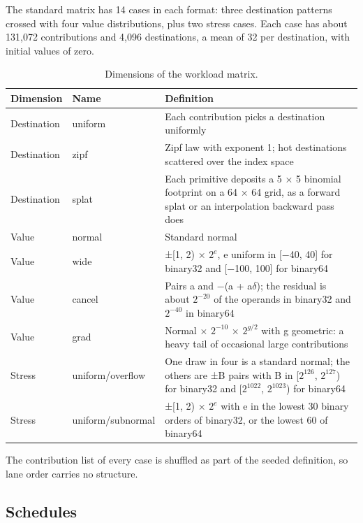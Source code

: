 \documentclass[journal]{IEEEtran}
\begin{document}
The standard matrix has 14 cases in each format: three destination
patterns crossed with four value distributions, plus two stress cases.
Each case has about 131,072 contributions and 4,096 destinations, a mean
of 32 per destination, with initial values of zero.

\begin{table}[!htbp]\centering\small\setlength{\tabcolsep}{4pt}
\caption{Dimensions of the workload matrix.}\label{tab:9}
\begin{tabularx}{\linewidth}{>{\raggedright\arraybackslash\hsize=0.608\hsize}X>{\raggedright\arraybackslash\hsize=0.851\hsize}X>{\raggedright\arraybackslash\hsize=1.541\hsize}X}
\toprule
Dimension & Name & Definition \\
\midrule
Destination & uniform & Each contribution picks a destination uniformly \\
Destination & zipf & Zipf law with exponent 1; hot destinations scattered over the index
space \\
Destination & splat & Each primitive deposits a 5 × 5 binomial footprint on a 64 × 64 grid, as
a forward splat or an interpolation backward pass does \\
Value & normal & Standard normal \\
Value & wide & ±{[}1, 2) × \(2^e\), e uniform in {[}−40, 40{]} for binary32 and
{[}−100, 100{]} for binary64 \\
Value & cancel & Pairs a and −(a + a$\delta$); the residual is about \(2^{-20}\) of the operands
in binary32 and \(2^{-40}\) in binary64 \\
Value & grad & Normal × \(2^{-10}\) × \(2^{g/2}\) with g geometric: a heavy tail of
occasional large contributions \\
Stress & uniform/overflow & One draw in four is a standard normal; the others are ±B pairs with B in
{[}\(2^{126}\), \(2^{127}\)) for binary32 and {[}\(2^{1022}\),
\(2^{1023}\)) for binary64 \\
Stress & uniform/subnormal & ±{[}1, 2) × \(2^e\) with e in the lowest 30 binary orders of binary32,
or the lowest 60 of binary64 \\
\bottomrule
\end{tabularx}
\end{table}

The contribution list of every case is shuffled as part of the seeded
definition, so lane order carries no structure.

\hypertarget{schedules}{%
\subsection{Schedules}\label{schedules}}
\end{document}
